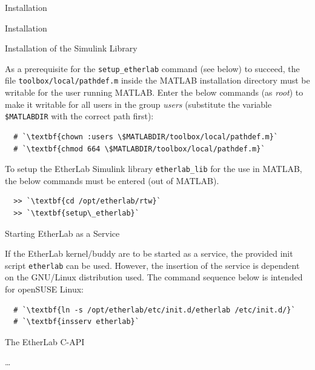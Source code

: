 \begin{ighsec}{Installation}
\begin{ighsec}{Installation}
\end{ighsec}

\begin{ighsec}{Installation of the Simulink Library}
\label{sec:inst-blockset}

As a prerequisite for the \texttt{setup\_etherlab} command (see below) to
succeed, the file \texttt{toolbox/local/pathdef.m} inside the MATLAB
installation directory must be writable for the user running MATLAB. Enter the
below commands (as \textit{root}) to make it writable for all users in the
group \textit{users} (substitute the variable \texttt{\$MATLABDIR} with the
correct path first):

\begin{lstlisting}
  # `\textbf{chown :users \$MATLABDIR/toolbox/local/pathdef.m}`
  # `\textbf{chmod 664 \$MATLABDIR/toolbox/local/pathdef.m}`
\end{lstlisting}

To setup the EtherLab Simulink library \texttt{etherlab\_lib} for the use in
MATLAB, the below commands must be entered (out of MATLAB).

\begin{lstlisting}
  >> `\textbf{cd /opt/etherlab/rtw}`
  >> `\textbf{setup\_etherlab}`
\end{lstlisting}

\end{ighsec}

\begin{ighsec}{Starting EtherLab as a Service}
\label{sec:dienst}

If the EtherLab kernel/buddy are to be started as a service, the provided init
script \texttt{etherlab} can be used. However, the insertion of the service is
dependent on the GNU/Linux distribution used. The command sequence below is
intended for openSUSE Linux:

\begin{lstlisting}
  # `\textbf{ln -s /opt/etherlab/etc/init.d/etherlab /etc/init.d/}`
  # `\textbf{insserv etherlab}`
\end{lstlisting}

\end{ighsec}

\end{ighsec}


\begin{ighsec}{The EtherLab C-API}
\label{sec:api}

\ldots

\end{ighsec}

